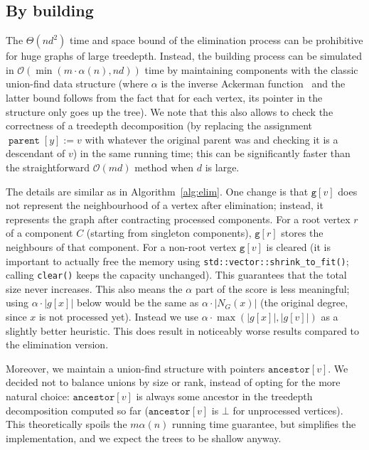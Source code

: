 \documentclass{timgad}
\newcommand{\Oh}{\ensuremath{\mathcal{O}}}
\DeclareMathOperator{\parent}{\texttt{parent}}
\begin{document}
\subsection{By building}
The $\Theta(nd^2)$ time and space bound of the elimination process can be prohibitive for huge graphs of large treedepth.
Instead, the building process can be simulated in $\Oh(\min(m \cdot \alpha(n), n d))$ time by maintaining components with the classic union-find data structure (where $\alpha$ is the inverse Ackerman function~\cite{TarjanL84} and the latter bound follows from the fact that for each vertex, its pointer in the structure only goes up the tree).
We note that this also allows to check the correctness of a treedepth decomposition (by replacing the assignment $\parent[y] := v$ with whatever the original parent was and checking it is a descendant of $v$) in the same running time;
this can be significantly faster than the straightforward $\Oh(md)$ method when $d$ is large.

The details are similar as in Algorithm~\ref{alg:elim}.
One change is that $\texttt{g}[v]$ does not represent the neighbourhood of a vertex after elimination;
instead, it represents the graph after contracting processed components.
For a root vertex $r$ of a component $C$ (starting from singleton components), $\texttt{g}[r]$ stores the neighbours of that component.
For a non-root vertex $\texttt{g}[v]$ is cleared (it is important to actually free the memory using \texttt{std::vector::shrink\_to\_fit()}; calling \texttt{clear()} keeps the capacity unchanged).
This guarantees that the total size never increases.
This also means the $\alpha$ part of the score is less meaningful;
using $\alpha \cdot |g[x]|$ below would be the same as $\alpha \cdot |N_G(x)|$ (the original degree, since $x$ is not processed yet).
Instead we use $\alpha \cdot \max(|g[x]|, |g[v]|)$ as a slightly better heuristic.
This does result in noticeably worse results compared to the elimination version.

Moreover, we maintain a union-find structure with pointers $\texttt{ancestor}[v]$.
We decided not to balance unions by size or rank, instead of opting for the more natural choice:
$\texttt{ancestor}[v]$ is always some ancestor in the treedepth decomposition computed so far
($\texttt{ancestor}[v]$ is $\bot$ for unprocessed vertices).
This theoretically spoils the $m \alpha(n)$ running time guarantee, but simplifies the implementation, and we expect the trees to be shallow anyway.
\end{document}
